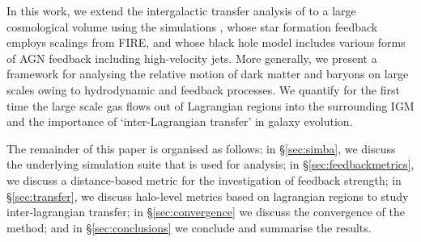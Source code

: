 In this work, we extend the intergalactic transfer analysis of
\citet{AnglesAlcazar2017} to a large cosmological volume using the \simba{}
simulations \citep{Dave2019}, whose star formation feedback employs scalings
from FIRE, and whose black hole model includes various forms of AGN feedback
including high-velocity jets. More generally, we present a framework for
analysing the relative motion of dark matter and baryons on large scales
owing to hydrodynamic and feedback processes. We quantify for the first time
the large scale gas flows out of Lagrangian regions into the surrounding IGM
and the importance of `inter-Lagrangian transfer' in galaxy evolution.

The remainder of this paper is organised as follows: in \S\ref{sec:simba}, we
discuss the underlying \simba{} simulation suite that is used for analysis;
in \S\ref{sec:feedbackmetrics}, we discuss a distance-based metric for the
investigation of feedback strength; in \S\ref{sec:transfer}, we discuss
halo-level metrics based on lagrangian regions to study inter-lagrangian
transfer; in \S\ref{sec:convergence} we discuss the convergence of the
method; and in \S\ref{sec:conclusions} we conclude and summarise the results.